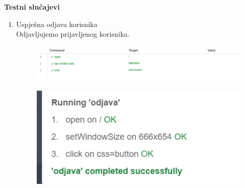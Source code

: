    \textbf{Testni slučajevi} \\
        \begin{enumerate}
    \item Uspješna odjava korisnika\\
        Odjavljujemo prijavljenog korisnika.
    \begin{figure}[H]
        \includegraphics[scale=0.30]{slike/deploy/fTest2a.png}
        \centering
        \label{fig:promjene2}
    \end{figure}
    \begin{figure}[H]
        \includegraphics[scale=0.30]{slike/deploy/fTest2b.png}
        \centering
        \label{fig:promjene1}
    \end{figure}
    


\end{enumerate}
